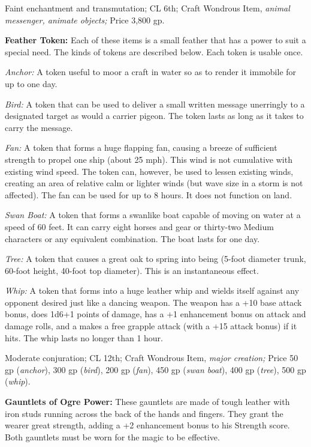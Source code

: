 \documentclass{article}
\begin{document}
Faint enchantment and transmutation; CL 6th; Craft Wondrous Item, \textit{animal 
messenger, animate objects; }Price 3,800 gp.

\textbf{Feather Token:} Each of these items is a small feather that has a power 
to suit a special need. The kinds of tokens are described below. Each token is 
usable once.

\textit{Anchor: }A token useful to moor a craft in water so as to render it immobile 
for up to one day.

\textit{Bird: }A token that can be used to deliver a small written message unerringly 
to a designated target as would a carrier pigeon. The token lasts as long as it 
takes to carry the message.

\textit{Fan: }A token that forms a huge flapping fan, causing a breeze of sufficient 
strength to propel one ship (about 25 mph). This wind is not cumulative with existing 
wind speed. The token can, however, be used to lessen existing winds, creating 
an area of relative calm or lighter winds (but wave size in a storm is not affected). 
The fan can be used for up to 8 hours. It does not function on land.

\textit{Swan Boat: }A token that forms a swanlike boat capable of moving on water 
at a speed of 60 feet. It can carry eight horses and gear or thirty-two Medium 
characters or any equivalent combination. The boat lasts for one day.

\textit{Tree: }A token that causes a great oak to spring into being (5-foot diameter 
trunk, 60-foot height, 40-foot top diameter). This is an instantaneous effect.

\textit{Whip: }A token that forms into a huge leather whip and wields itself against 
any opponent desired just like a dancing weapon. The weapon has a +10 base attack 
bonus, does 1d6+1 points of damage, has a +1 enhancement bonus on attack and damage 
rolls, and a makes a free grapple attack (with a +15 attack bonus) if it hits. 
The whip lasts no longer than 1 hour.

Moderate conjuration; CL 12th; Craft Wondrous Item, \textit{major creation; }Price 
50 gp (\textit{anchor}), 300 gp (\textit{bird}), 200 gp (\textit{fan}), 450 gp 
(\textit{swan boat}), 400 gp (\textit{tree}), 500 gp (\textit{whip}).

\textbf{Gauntlets of Ogre Power: }These gauntlets are made of tough leather with 
iron studs running across the back of the hands and fingers. They grant the wearer 
great strength, adding a +2 enhancement bonus to his Strength score. Both gauntlets 
must be worn for the magic to be effective.
\end{document}
